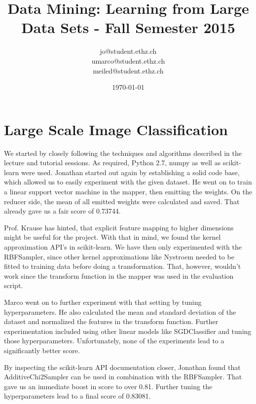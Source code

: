 \documentclass[a4paper, 11pt]{article}
\title{Data Mining: Learning from Large Data Sets - Fall Semester 2015}
\author{jo@student.ethz.ch\\ umarco@student.ethz.ch\\ meiled@student.ethz.ch\\}
\date{\today}
\begin{document}
\maketitle

\section*{Large Scale Image Classification}
We started by closely following the techniques and algorithms described in the lecture and tutorial sessions. As required, Python 2.7, numpy as well as scikit-learn were used.
Jonathan started out again by establishing a solid code base, which allowed us to easily experiment with the given dataset. He went on to train a linear support vector machine in the mapper, then emitting the weights. On the reducer side, the mean of all emitted weights were calculated and saved. That already gave us a fair score of 0.73744.

Prof. Krause has hinted, that explicit feature mapping to higher dimensions might be useful for the project. With that in mind, we found the kernel approximation API's in scikit-learn. We have then only experimented with the RBFSampler, since other kernel approximations like Nystroem needed to be fitted to training data before doing a transformation. That, however, wouldn't work since the transform function in the mapper was used in the evaluation script.

Marco went on to further experiment with that setting by tuning hyperparameters. He also calculated the mean and standard deviation of the dataset and normalized the features in the transform function. Further experimentation included using other linear models like SGDClassifier and tuning those hyperparameters. Unfortunately, none of the experiments lead to a significantly better score.

By inspecting the scikit-learn API documentation closer, Jonathan found that AdditiveChi2Sampler can be used in combination with the RBFSampler. That gave us an immediate boost in score to over 0.81. Further tuning the hyperparameters lead to a final score of 0.83081.
\end{document}

